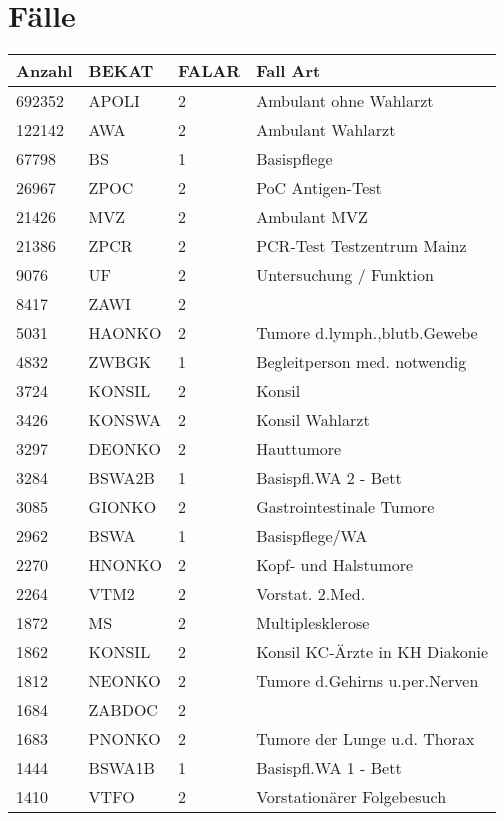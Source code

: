 \section{Fälle}
\begin{center}
 \begin{longtable}{|p{2.3cm}|p{2.3cm}|p{2.2cm}|p{6cm}|}
  \hline
\rowcolor{lightgray} Anzahl & BEKAT & FALAR & Fall Art \\ \hline
\endhead
692352 & APOLI & 2 & Ambulant ohne Wahlarzt \\ \hline
122142 & AWA & 2 & Ambulant Wahlarzt \\ \hline
67798 & BS & 1 & Basispflege \\ \hline
26967 & ZPOC & 2 & PoC Antigen-Test \\ \hline
21426 & MVZ & 2 & Ambulant MVZ \\ \hline
21386 & ZPCR & 2 & PCR-Test Testzentrum Mainz \\ \hline
9076 & UF & 2 & Untersuchung / Funktion \\ \hline
8417 & ZAWI & 2 &  \\ \hline
5031 & HAONKO & 2 & Tumore d.lymph.,blutb.Gewebe \\ \hline
4832 & ZWBGK & 1 & Begleitperson med. notwendig \\ \hline
3724 & KONSIL & 2 & Konsil \\ \hline
3426 & KONSWA & 2 & Konsil Wahlarzt \\ \hline
3297 & DEONKO & 2 & Hauttumore \\ \hline
3284 & BSWA2B & 1 & Basispfl.WA 2 - Bett \\ \hline
3085 & GIONKO & 2 & Gastrointestinale Tumore \\ \hline
2962 & BSWA & 1 & Basispflege/WA \\ \hline
2270 & HNONKO & 2 & Kopf- und Halstumore \\ \hline
2264 & VTM2 & 2 & Vorstat. 2.Med. \\ \hline
1872 & MS & 2 & Multiplesklerose \\ \hline
1862 & KONSIL & 2 & Konsil KC-Ärzte in KH Diakonie \\ \hline
1812 & NEONKO & 2 & Tumore d.Gehirns u.per.Nerven \\ \hline
1684 & ZABDOC & 2 &  \\ \hline
1683 & PNONKO & 2 & Tumore der Lunge u.d. Thorax \\ \hline
1444 & BSWA1B & 1 & Basispfl.WA 1 - Bett \\ \hline
1410 & VTFO & 2 & Vorstationärer Folgebesuch \\ \hline

\end{longtable}
\end{center}
